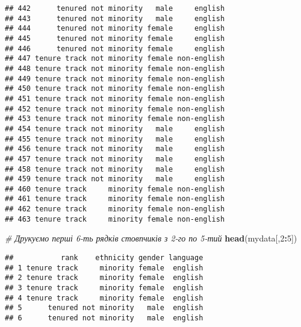 \documentclass[
]{article}
\newenvironment{Shaded}{\begin{snugshade}}{\end{snugshade}}
\newcommand{\CommentTok}[1]{\textcolor[rgb]{0.56,0.35,0.01}{\textit{#1}}}
\newcommand{\DecValTok}[1]{\textcolor[rgb]{0.00,0.00,0.81}{#1}}
\newcommand{\KeywordTok}[1]{\textcolor[rgb]{0.13,0.29,0.53}{\textbf{#1}}}
\newcommand{\NormalTok}[1]{#1}
\newcommand{\OperatorTok}[1]{\textcolor[rgb]{0.81,0.36,0.00}{\textbf{#1}}}
\begin{document}
\begin{verbatim}
## 442      tenured not minority   male     english
## 443      tenured not minority   male     english
## 444      tenured not minority female     english
## 445      tenured not minority female     english
## 446      tenured not minority female     english
## 447 tenure track not minority female non-english
## 448 tenure track not minority female non-english
## 449 tenure track not minority female non-english
## 450 tenure track not minority female non-english
## 451 tenure track not minority female non-english
## 452 tenure track not minority female non-english
## 453 tenure track not minority female non-english
## 454 tenure track not minority   male     english
## 455 tenure track not minority   male     english
## 456 tenure track not minority   male     english
## 457 tenure track not minority   male     english
## 458 tenure track not minority   male     english
## 459 tenure track not minority   male     english
## 460 tenure track     minority female non-english
## 461 tenure track     minority female non-english
## 462 tenure track     minority female non-english
## 463 tenure track     minority female non-english
\end{verbatim}

\begin{Shaded}
\begin{Highlighting}[]
\CommentTok{# Друкуємо перші 6-ть рядків стовпчиків з 2-го по 5-тий}
\KeywordTok{head}\NormalTok{(mydata[,}\DecValTok{2}\OperatorTok{:}\DecValTok{5}\NormalTok{])}
\end{Highlighting}
\end{Shaded}

\begin{verbatim}
##           rank    ethnicity gender language
## 1 tenure track     minority female  english
## 2 tenure track     minority female  english
## 3 tenure track     minority female  english
## 4 tenure track     minority female  english
## 5      tenured not minority   male  english
## 6      tenured not minority   male  english
\end{verbatim}

\begin{Shaded}
\end{Shaded}
\end{document}
